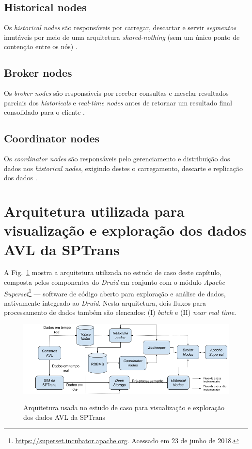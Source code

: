 \documentclass[
	12pt,				%
	oneside,			%
	a4paper,			%
	english,			%
	brazil				%
	]{abntex2ppgsi}
\begin{document}
{{\subsection{Historical nodes}

Os \textit{historical nodes} são responsáveis por carregar, descartar e servir \emph{segmentos} imutáveis por meio de uma arquitetura \textit{shared-nothing} (sem um único ponto de contenção entre os nós) \cite{yang2014druid}.

\subsection{Broker nodes}

Os \textit{broker nodes} são responsáveis por receber consultas e mesclar resultados parciais dos \textit{historicals} e \textit{real-time nodes} antes de retornar um resultado final consolidado para o cliente \cite{yang2014druid}.

\subsection{Coordinator nodes}

Os \textit{coordinator nodes} são responsáveis pelo gerenciamento e distribuição dos dados nos \textit {historical nodes}, exigindo destes o carregamento, descarte e replicação dos dados \cite{yang2014druid}.

\section{Arquitetura utilizada para visualização e exploração dos dados AVL da SPTrans}
\label{arch_viz}

A Fig.~\ref{fig:viz_arch} mostra a arquitetura utilizada no estudo de caso deste capítulo, composta pelos componentes do \textit{Druid} em conjunto com o módulo \textit {Apache Superset}\footnote{\url{https://superset.incubator.apache.org}. Acessado em 23 de junho de 2018.} --- software de código aberto para exploração e análise de dados, nativamente integrado ao \textit{Druid}. Nesta arquitetura, dois fluxos para processamento de dados também são elencados: (I) \textit{batch} e (II) \textit{near real time}.

\begin{figure}[!htb]%
	\centering
 	  \caption{Arquitetura usada no estudo de caso para visualização e exploração dos dados AVL da SPTrans}
		\includegraphics[width=1\linewidth]{images/viz_arch_pt.png}
	\label{fig:viz_arch}
\end{figure}

}}
\end{document}
